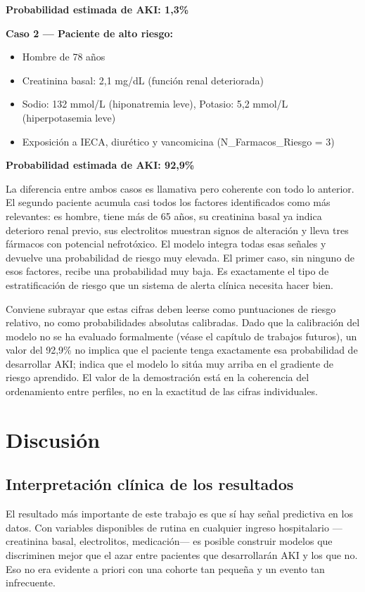 \documentclass[12pt, a4paper, oneside]{report}
\begin{document}
\textbf{Probabilidad estimada de AKI: 1,3\%}

\textbf{Caso 2 — Paciente de alto riesgo:}
\begin{itemize}
    \item Hombre de 78 años
    \item Creatinina basal: 2,1 mg/dL (función renal deteriorada)
    \item Sodio: 132 mmol/L (hiponatremia leve), Potasio: 5,2 mmol/L (hiperpotasemia leve)
    \item Exposición a IECA, diurético y vancomicina (N\_Farmacos\_Riesgo = 3)
\end{itemize}

\textbf{Probabilidad estimada de AKI: 92,9\%}

La diferencia entre ambos casos es llamativa pero coherente con todo lo anterior. El segundo paciente acumula casi todos los factores identificados como más relevantes: es hombre, tiene más de 65 años, su creatinina basal ya indica deterioro renal previo, sus electrolitos muestran signos de alteración y lleva tres fármacos con potencial nefrotóxico. El modelo integra todas esas señales y devuelve una probabilidad de riesgo muy elevada. El primer caso, sin ninguno de esos factores, recibe una probabilidad muy baja. Es exactamente el tipo de estratificación de riesgo que un sistema de alerta clínica necesita hacer bien.

Conviene subrayar que estas cifras deben leerse como puntuaciones de riesgo relativo, no como probabilidades absolutas calibradas. Dado que la calibración del modelo no se ha evaluado formalmente (véase el capítulo de trabajos futuros), un valor del 92,9\% no implica que el paciente tenga exactamente esa probabilidad de desarrollar AKI; indica que el modelo lo sitúa muy arriba en el gradiente de riesgo aprendido. El valor de la demostración está en la coherencia del ordenamiento entre perfiles, no en la exactitud de las cifras individuales.

\section{Discusión}
\subsection{Interpretación clínica de los resultados}

El resultado más importante de este trabajo es que sí hay señal predictiva en los datos. Con variables disponibles de rutina en cualquier ingreso hospitalario —creatinina basal, electrolitos, medicación— es posible construir modelos que discriminen mejor que el azar entre pacientes que desarrollarán AKI y los que no. Eso no era evidente a priori con una cohorte tan pequeña y un evento tan infrecuente.
\end{document}
